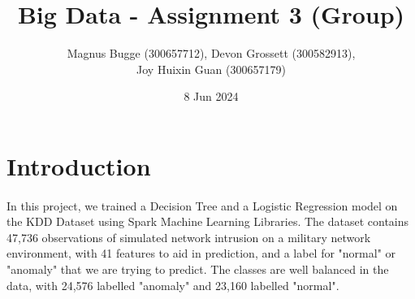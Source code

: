 \documentclass[12pt, letterpaper]{article}
\title{Big Data - Assignment 3 (Group)}
\author{Magnus Bugge (300657712), Devon Grossett (300582913), \\ Joy Huixin Guan (300657179)}
\date{8 Jun 2024}
\begin{document}
\maketitle

\section{Introduction}
\paragraph{}
In this project, we trained a Decision Tree and a Logistic Regression model on the KDD Dataset 
\cite{JAM} using Spark Machine Learning Libraries. The dataset contains 47,736 observations of simulated network intrusion on a military network environment, with 41 features to aid in prediction, and a label for "normal" or "anomaly" that we are trying to predict. The classes are well balanced in the data, with 24,576 labelled "anomaly" and 23,160 labelled "normal".
\end{document}
